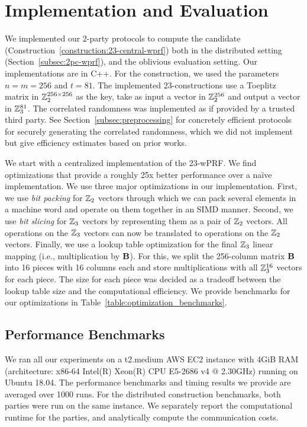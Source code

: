 \section{Implementation and Evaluation}
\label{sec:implementation_and_eval}
We implemented our 2-party protocols to compute the \ttwPRF candidate (Construction~\ref{construction:23-central-wprf}) both in the distributed setting (Section~\ref{subsec:2pc-wprf}), and the oblivious evaluation setting. Our implementations are in C++. For the \ttwPRF construction, we used the parameters $n = m = 256$ and $t = 81$. The implemented 23-constructions use a Toeplitz matrix in $\mathbb{Z}_2^{256 \times 256}$ as the key, take as input a vector in $\mathbb{Z}_2^{256}$ and output a vector in $\mathbb{Z}_3^{81}$. The correlated randomness was implemented as if provided by a trusted third party. See Section~\ref{subsec:preprocessing} for concretely efficient protocols for securely generating the correlated randomness, which we did not implement but give efficiency estimates based on prior works. 


We start with a centralized implementation of the 23-wPRF. We find optimizations that provide a roughly 25x better performance over a na\"ive implementation. We use three major optimizations in our implementation. First, we use \textit{bit packing} for $\mathbb{Z}_2$ vectors through which we can pack several elements in a machine word and operate on them together in an SIMD manner. Second, we use \textit{bit slicing} for $\mathbb{Z}_3$ vectors by representing them as a pair of $\mathbb{Z}_2$ vectors. All operations on the $\mathbb{Z}_3$ vectors can now be translated to operations on the $\mathbb{Z}_2$ vectors. Finally, we use a lookup table optimization for the final $\mathbb{Z}_3$ linear mapping (i.e., multiplication by $\mat{B}$). For this, we split the 256-column matrix $\mat{B}$ into 16 pieces with 16 columns each and store multiplications with all $\mathbb{Z}_3^{16}$ vectors for each piece. The size for each piece was decided as a tradeoff between the lookup table size and the computational efficiency. We provide benchmarks for our optimizations in Table~\ref{table:optimization_benchmarks}.


\subsection{Performance Benchmarks}
\label{subsec:performance}
We ran all our experiments on a t2.medium AWS EC2 instance with 4GiB RAM (architecture: x86-64 Intel(R) Xeon(R) CPU E5-2686 v4 @ 2.30GHz) running on Ubuntu 18.04. The performance benchmarks and timing results we provide are averaged over 1000 runs. For the distributed construction benchmarks, both parties were run on the same instance. We separately report the computational runtime for the parties, and analytically compute the communication costs. 

